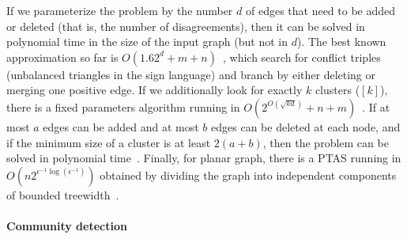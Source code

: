 If we parameterize the problem by the number $d$ of edges that need to be added or deleted (that is,
the number of disagreements), then it can be solved in polynomial time in the size of the input
graph (but not in $d$). The best known approximation so far is
$O(1.62^d+m+n)$~\autocite{GoldenCE12}, which search for conflict triples (\ie unbalanced triangles
in the sign language) and branch by either deleting or merging one positive edge. If we additionally
look for exactly $k$ clusters (\ie \mind$[k]$), there is a fixed parameters algorithm running in
$O(2^{O(\sqrt{kd})}+n+m)$~\autocite{Fomin2014}. If at most $a$ edges can be added and at most $b$
edges can be deleted at each node, and if the minimum size of a cluster is at least $2(a+b)$, then
the problem can be solved in polynomial time~\autocite{Abu-Khzam2015}. Finally, for planar graph,
there is a PTAS running in $O(n2^{\epsilon^{-1}\log(\epsilon^{-1})})$ obtained by dividing the graph
into independent components of bounded treewidth~\autocite{PlanarCEPTAS17}.

\paragraph{Community detection}

